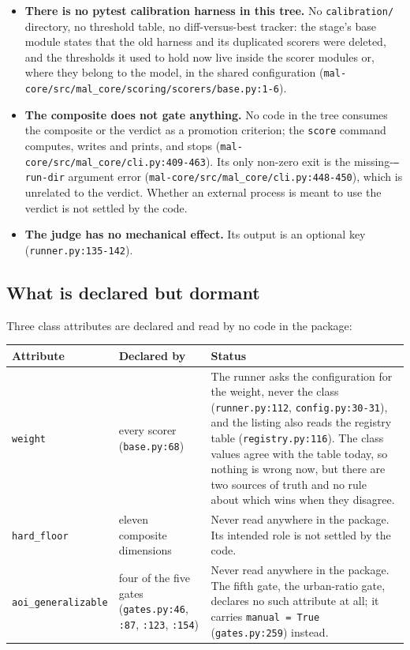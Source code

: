 \documentclass[11pt,a4paper]{article}
\newcommand{\code}[1]{\texttt{#1}}
\begin{document}
\begin{itemize}
\item \textbf{There is no pytest calibration harness in this tree.} No
      \code{calibration/} directory, no threshold table, no
      diff-versus-best tracker: the stage's base module states that the old
      harness and its duplicated scorers were deleted, and the thresholds it
      used to hold now live inside the scorer modules or, where they belong
      to the model, in the shared configuration
      (\code{mal-core/src/mal\_core/scoring/scorers/base.py:1-6}).
\item \textbf{The composite does not gate anything.} No code in the tree
      consumes the composite or the verdict as a promotion criterion; the
      \code{score} command computes, writes and prints, and stops
      (\code{mal-core/src/mal\_core/cli.py:409-463}). Its only non-zero exit
      is the missing-\code{--run-dir} argument error
      (\code{mal-core/src/mal\_core/cli.py:448-450}), which is unrelated to
      the verdict. Whether an external process is meant to use the verdict
      is not settled by the code.
\item \textbf{The judge has no mechanical effect.} Its output is an optional
      key (\code{runner.py:135-142}).
\end{itemize}

\subsection{What is declared but dormant}

Three class attributes are declared and read by no code in the package:

\begin{longtable}{@{}p{3.2cm}p{4.4cm}p{6.4cm}@{}}
\toprule
Attribute & Declared by & Status \\
\midrule
\endhead
\code{weight} & every scorer (\code{base.py:68}) & The runner asks the
configuration for the weight, never the class (\code{runner.py:112},
\code{config.py:30-31}), and the listing also reads the registry table
(\code{registry.py:116}). The class values agree with the table today, so
nothing is wrong now, but there are two sources of truth and no rule about
which wins when they disagree. \\
\code{hard\_floor} & eleven composite dimensions & Never read anywhere in
the package. Its intended role is not settled by the code. \\
\code{aoi\_generalizable} & four of the five gates (\code{gates.py:46},
\code{:87}, \code{:123}, \code{:154}) & Never read
anywhere in the package. The fifth gate, the urban-ratio gate, declares no
such attribute at all; it carries \code{manual = True}
(\code{gates.py:259}) instead. \\
\end{longtable}
\end{document}
